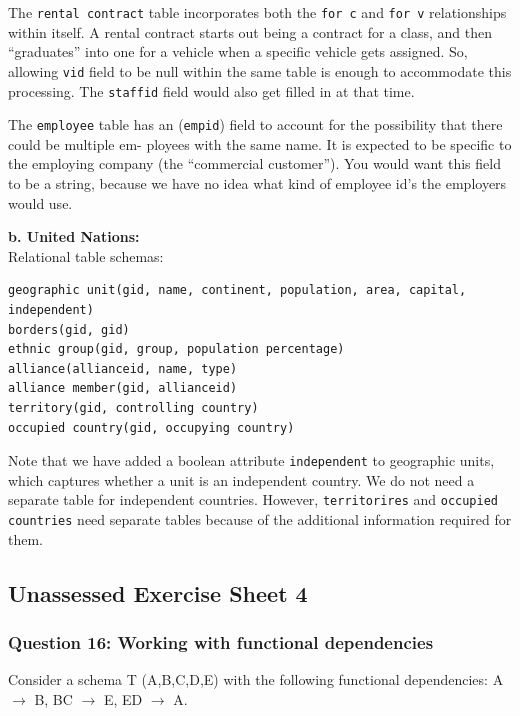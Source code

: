 The \texttt{rental contract} table incorporates both the \texttt{for c} and \texttt{for v} relationships within itself. A rental
contract starts out being a contract for a class, and then “graduates” into one for a vehicle when a specific
vehicle gets assigned. So, allowing \texttt{vid} field to be null within the same table is enough to accommodate
this processing. The \texttt{staffid} field would also get filled in at that time.

The \texttt{employee} table has an (\texttt{empid}) field to account for the possibility that there could be multiple em-
ployees with the same name. It is expected to be specific to the employing company (the “commercial
customer”). You would want this field to be a string, because we have no idea what kind of employee id’s
the employers would use.

\textbf{b. United Nations:} \\
Relational table schemas:

\begin{verbatim}
geographic unit(gid, name, continent, population, area, capital, independent)
borders(gid, gid)
ethnic group(gid, group, population percentage)
alliance(allianceid, name, type)
alliance member(gid, allianceid)
territory(gid, controlling country)
occupied country(gid, occupying country)
\end{verbatim}

Note that we have added a boolean attribute \texttt{independent} to geographic units, which captures whether
a unit is an independent country. We do not need a separate table for independent countries. However,
\texttt{territorires} and \texttt{occupied countries} need separate tables because of the additional information required for
them.




\subsection{Unassessed Exercise Sheet 4}

\subsubsection{Question 16: Working with functional dependencies}

Consider a schema T (A,B,C,D,E) with the following functional dependencies: A$\rightarrow$ B, BC $\rightarrow$ E, ED $\rightarrow$ A.

